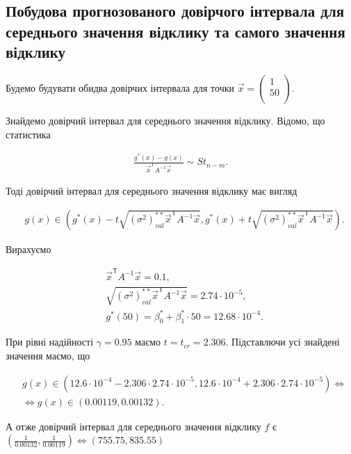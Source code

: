\documentclass[14pt,a4paper]{scrartcl}
\theoremstyle{definition}
\theoremstyle{remark}
\theoremstyle{definition}
\theoremstyle{definition}
\begin{document}
\subsection{Побудова прогнозованого довірчого інтервала для середнього значення відклику та самого значення відклику}

Будемо будувати обидва довірчих інтервала для точки $\vec{x} = \begin{pmatrix}
  1 \\
  50 \\
\end{pmatrix}$.

Знайдемо довірчий інтервал для середнього значення відклику. Відомо, що статистика

\begin{align*}
  \frac{g^{*}(x) - g(x)}{\vec{x}^\mathsf{T}A^{-1}\vec{x}} \sim St_{n - m}.
\end{align*}

Тоді довірчий інтервал для середнього значення відклику має вигляд

\begin{align*}
  & g(x) \in \left( g^{*}(x) - t \sqrt{(\sigma^2)^{**}_{val}  \vec{x}^\mathsf{T} A^{-1} \vec{x}}, g^{*}(x) + t \sqrt{(\sigma^2)^{**}_{val} \vec{x}^\mathsf{T} A^{-1} \vec{x}}  \right).
\end{align*}

Вирахуємо

\begin{align*}
  & \vec{x}^\mathsf{T}A^{-1}\vec{x} = 0.1, \\
  & \sqrt{(\sigma^2)^{**}_{val} \vec{x}^\mathsf{T} A^{-1} \vec{x}} = 2.74 \cdot 10^{-5}, \\
  & g^{*}(50) = \beta^{*}_{0} +  \beta^{*}_{1} \cdot 50 = 12.68 \cdot 10^{-4}.
\end{align*}

При рівні надійності $\gamma = 0.95$ маємо $t = t_{cr} = 2.306$. Підставлючи усі знайдені значення маємо, що

\begin{align*}
  & g(x) \in \left( 12.6\cdot 10^{-4} - 2.306 \cdot 2.74\cdot 10^{-5}, 12.6\cdot 10^{-4} + 2.306 \cdot 2.74\cdot 10^{-5}  \right) \Leftrightarrow \\ & \Leftrightarrow g(x) \in \left( 0.00119, 0.00132 \right).
\end{align*}

А отже довірчий інтервал для середнього значення відклику $f$ є $(\frac{1}{0.00132}, \frac{1}{0.00119}) \Leftrightarrow (755.75, 835.55)$
\end{document}
